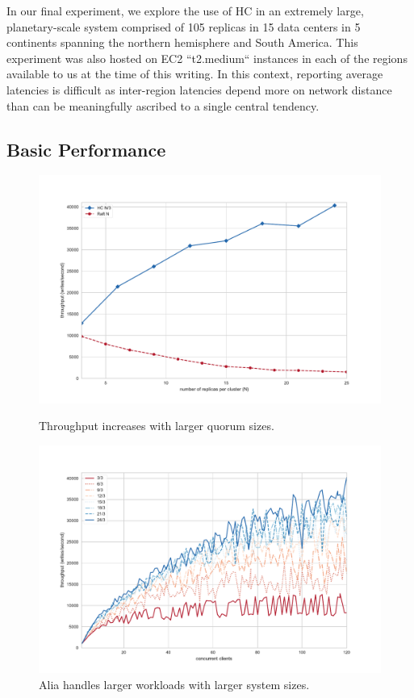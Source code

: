 \documentclass[10pt,conference]{IEEEtran}
\begin{document}
In our final experiment, we explore the use of HC in an extremely
large, planetary-scale system comprised of 105 replicas in 15 data centers in 5
continents spanning the northern hemisphere and South America. This experiment was also
hosted on EC2 ``t2.medium`` instances in each of the regions available to us at the time
of this writing. In this context, reporting average latencies is difficult as
inter-region latencies depend more on network distance than can be meaningfully
ascribed to a single central tendency.

\subsection{Basic Performance}
\label{section:performance}

\begin{figure}[t]
    \centering
        \includegraphics[width=\linewidth]{figures/scaling.pdf}
        \caption{Throughput increases with larger quorum sizes.}
        \label{fig:scaling_consensus}
    \endminipage\hfill
        \includegraphics[width=\linewidth]{figures/hc_throughput_workload.pdf}
        \caption{Alia handles larger workloads with larger system sizes.}
        \label{fig:throughput_workload}
    \endminipage
\end{figure}
\end{document}
